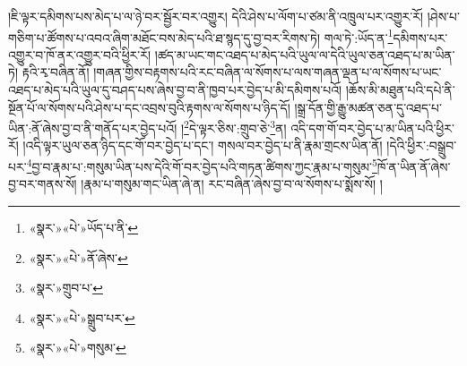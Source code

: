 །ཇི་ལྟར་དམིགས་པས་མེད་པ་ལ་ཉེ་བར་སྦྱོར་བར་འགྱུར། དེའི་ཤེས་པ་ལོག་པ་ཙམ་ནི་འཁྲུལ་པར་འགྱུར་རོ། །ཤེས་པ་གཅིག་པ་ཚོགས་པ་འབའ་ཞིག་མཐོང་བས་མེད་པའི་ཐ་སྙད་དུ་བྱ་བར་རིགས་ཏེ། གལ་ཏེ་:ཡོད་ན་\footnote{«སྣར་»«པེ་»ཡོད་པ་ནི་}དམིགས་པར་འགྱུར་བ་ཁོ་ནར་འགྱུར་བའི་ཕྱིར་རོ། །ཚད་མ་ཡང་གང་འཐད་པ་མེད་པའི་ཡུལ་ལ་དེའི་ཡུལ་ཅན་འཐད་པ་མ་ཡིན་ཏེ། རྟའི་རྭ་བཞིན་ནོ། །གཞན་གྱིས་བརྟགས་པའི་རང་བཞིན་ལ་སོགས་པ་ལས་གཞན་ལྡན་པ་ལ་སོགས་པ་ཡང་འཐད་པ་མེད་པའི་ཡུལ་དུ་བཤད་པས་ཞེས་བྱ་བ་ནི་ཁྱབ་པར་བྱེད་པ་མི་དམིགས་པའོ། །ཆོས་མི་མཐུན་པའི་དཔེ་ནི་སྔོན་པོ་ལ་སོགས་པའི་ཤེས་པ་དང་འབྲས་བུའི་རྟགས་ལ་སོགས་པ་ཉིད་དོ། །སྒྲ་དོན་གྱི་རྒྱུ་མཚན་ཅན་དུ་འཐད་པ་ཡིན་:ནོ་ཞེས་བྱ་བ་ནི་གནོད་པར་བྱེད་པའོ། །\footnote{«སྣར་»«པེ་»ནོ་ཞེས་}དེ་ལྟར་ཅིས་:གྲུབ་ཅེ་\footnote{«སྣར་»གྲུབ་པ་}ན། འདི་དག་གོ་བར་བྱེད་པ་མ་ཡིན་པའི་ཕྱིར་རོ། །འདི་ལྟར་ཡུལ་ཅན་ཉིད་དང་གོ་བར་བྱེད་པ་དང་། གསལ་བར་བྱེད་པ་ནི་རྣམ་གྲངས་ཡིན་ནོ། །དེའི་ཕྱིར་:བསྒྲུབ་པར་\footnote{«སྣར་»«པེ་»སྒྲུབ་པར་}བྱ་བ་རྣམ་པ་:གསུམ་ཡིན་པས་དེའི་གོ་བར་བྱེད་པའི་གཏན་ཚིགས་ཀྱང་རྣམ་པ་གསུམ་\footnote{«སྣར་»«པེ་»གསུམ་}ཁོ་ན་ཡིན་ནོ་ཞེས་བྱ་བར་གནས་སོ། །རྣམ་པ་གསུམ་གང་ཡིན་ཞེ་ན། རང་བཞིན་ཞེས་བྱ་བ་ལ་སོགས་པ་སྨོས་སོ། །

